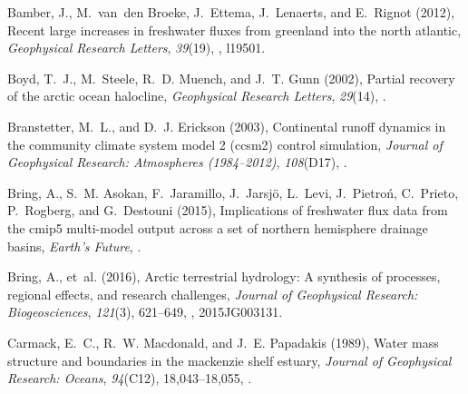 \documentclass[jgrga, draft]{agutex}
\begin{document}
\begin{article}
\begin{thebibliography}{79}
Bamber, J., M.~van~den Broeke, J.~Ettema, J.~Lenaerts, and E.~Rignot (2012),
  Recent large increases in freshwater fluxes from greenland into the north
  atlantic, \textit{Geophysical Research Letters}, \textit{39}(19),
  , l19501.

Boyd, T.~J., M.~Steele, R.~D. Muench, and J.~T. Gunn (2002), Partial recovery
  of the arctic ocean halocline, \textit{Geophysical Research Letters},
  \textit{29}(14), .

Branstetter, M.~L., and D.~J. Erickson (2003), Continental runoff dynamics in
  the community climate system model 2 (ccsm2) control simulation,
  \textit{Journal of Geophysical Research: Atmospheres (1984--2012)},
  \textit{108}(D17), .

Bring, A., S.~M. Asokan, F.~Jaramillo, J.~Jarsj{\"o}, L.~Levi, J.~Pietro{\'n},
  C.~Prieto, P.~Rogberg, and G.~Destouni (2015), Implications of freshwater
  flux data from the cmip5 multi-model output across a set of northern
  hemisphere drainage basins, \textit{Earth's Future},
  .

Bring, A., et~al. (2016), Arctic terrestrial hydrology: A synthesis of
  processes, regional effects, and research challenges, \textit{Journal of
  Geophysical Research: Biogeosciences}, \textit{121}(3), 621--649,
  , 2015JG003131.

Carmack, E.~C., R.~W. Macdonald, and J.~E. Papadakis (1989), Water mass
  structure and boundaries in the mackenzie shelf estuary, \textit{Journal of
  Geophysical Research: Oceans}, \textit{94}(C12), 18,043--18,055,
  .



\end{thebibliography}
\end{article}
\end{document}
